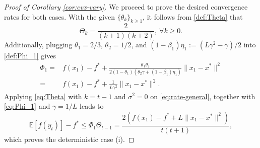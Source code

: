 \documentclass[10pt]{article}
\numberwithin{equation}{section}
\theoremstyle{definition}
\newcommand{\ebb}{\mathbb{E}}  %
\begin{document}
\begin{proof}[Proof of Corollary \ref{cor:cvx-vary}]
    We proceed to prove the desired convergence rates for both cases. With the given $\{\theta_k\}_{k\ge 1}$, it follows from \eqref{def:Theta} that
    \begin{equation}\label{eq:Theta}
        \Theta_k = \frac{2}{(k+1)(k+2)},~\forall k\ge 0.
    \end{equation}
    Additionally, plugging $\theta_1=2/3$, $\theta_2=1/2$, and $(1-\beta_1)\eta_1:=(L\gamma^2-\gamma)/2$ into \eqref{def:Phi_1} gives
    \begin{equation}\label{eq:Phi_1}
    \begin{aligned}
       \Phi_1=&f(x_1)-f^*+\frac{\theta_1\theta_2}{2(1-\theta_1)(\theta_2\gamma+(1-\beta_1)\eta_1)}\|x_1-x^*\|^2\\
       =&f(x_1)-f^*+\frac{1}{L\gamma^2}\|x_1-x^*\|^2.
    \end{aligned}
    \end{equation}
    Applying \eqref{eq:Theta} with $k=t-1$ and $\sigma^2=0$ on \eqref{eq:rate-general}, together with \eqref{eq:Phi_1} and $\gamma=1/L$ leads to
    \[
        \ebb[f(y_t)]-f^*\leq \Phi_1\Theta_{t-1} = \frac{2(f(x_1)-f^*+L\|x_1-x^*\|^2)}{t(t+1)},
    \]
    which proves the deterministic case (i).


\end{proof}
\end{document}
